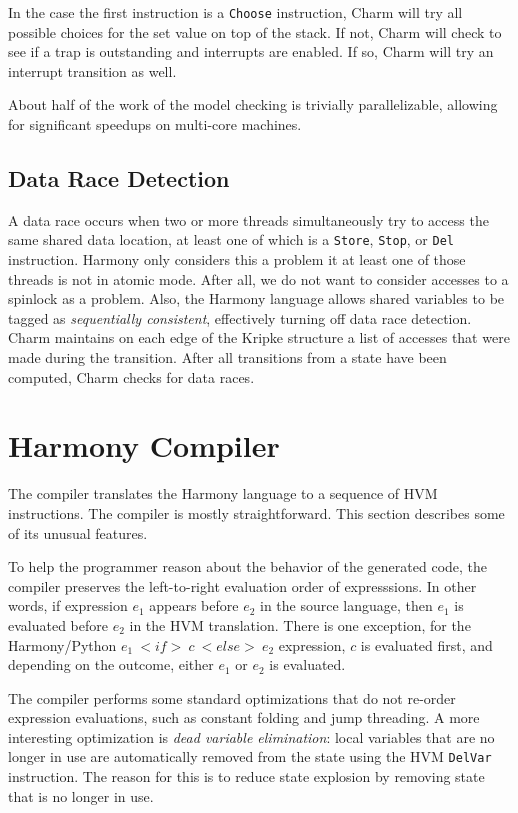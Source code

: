 \documentclass[twocolumn]{article}
\begin{document}
In the case the first instruction is a \texttt{Choose} instruction,
Charm will try all possible choices for the set value
on top of the stack.  If not, Charm will check to
see if a trap is outstanding and interrupts are enabled.  If so,
Charm will try an interrupt transition as well.

About half of the work of the model checking is trivially parallelizable,
allowing for significant speedups on multi-core machines.

\subsection{Data Race Detection}

A data race occurs when two or more threads simultaneously try to
access the same shared data location, at least one of which is a
\texttt{Store}, \texttt{Stop}, or \texttt{Del} instruction.  Harmony
only considers this a problem it at least one of those threads is
not in atomic mode.  After all, we do not want to consider accesses
to a spinlock as a problem.  Also, the Harmony language allows
shared variables to be tagged as \emph{sequentially consistent},
effectively turning off data race detection.  Charm maintains on
each edge of the Kripke structure a list of accesses that were made
during the transition.  After all transitions from a state have been
computed, Charm checks for data races.

\section{Harmony Compiler}

The compiler translates the Harmony language to a sequence of HVM
instructions.  The compiler is mostly straightforward.  This section
describes some of its unusual features.

To help the programmer reason about the behavior of the generated code,
the compiler preserves the left-to-right evaluation order of
expresssions.  In other words, if expression $e_1$ appears before
$e_2$ in the source language, then $e_1$ is evaluated before $e_2$
in the HVM translation.  There is one exception, for the Harmony/Python
$e_1~<{if}>~c~<{else}>~e_2$ expression, $c$ is evaluated first, and
depending on the outcome, either $e_1$ or $e_2$ is evaluated.

The compiler performs some standard optimizations that do not re-order
expression evaluations, such as constant folding and jump threading.
A more interesting optimization is \emph{dead variable elimination}:
local variables that are no longer in use are automatically removed
from the state using the HVM \texttt{DelVar} instruction.  The reason
for this is to reduce state explosion by removing state that is no
longer in use.
\end{document}
